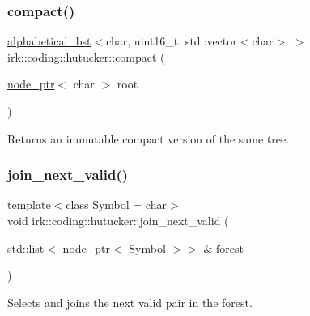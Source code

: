 \subsubsection{\texorpdfstring{compact()}{compact()}}
{\footnotesize\ttfamily \mbox{\hyperlink{classirk_1_1alphabetical__bst}{alphabetical\+\_\+bst}}$<$char, uint16\+\_\+t, std\+::vector$<$char$>$ $>$ irk\+::coding\+::hutucker\+::compact (\begin{DoxyParamCaption}\item[{\mbox{\hyperlink{namespaceirk_1_1coding_1_1hutucker_aa5d22cfdf05ffec38f2531e0307248fe}{node\+\_\+ptr}}$<$ char $>$}]{root }\end{DoxyParamCaption})}



Returns an immutable compact version of the same tree. 

\mbox{\label{namespaceirk_1_1coding_1_1hutucker_ad43136697500a2cc05315ab694767d84}} 
\subsubsection{\texorpdfstring{join\+\_\+next\+\_\+valid()}{join\_next\_valid()}}
{\footnotesize\ttfamily template$<$class Symbol  = char$>$ \\
void irk\+::coding\+::hutucker\+::join\+\_\+next\+\_\+valid (\begin{DoxyParamCaption}\item[{std\+::list$<$ \mbox{\hyperlink{namespaceirk_1_1coding_1_1hutucker_aa5d22cfdf05ffec38f2531e0307248fe}{node\+\_\+ptr}}$<$ Symbol $>$$>$ \&}]{forest }\end{DoxyParamCaption})}



Selects and joins the next valid pair in the forest. 

\mbox{\label{namespaceirk_1_1coding_1_1hutucker_afc598a2671de17423c5d2c0427aab320}} 
